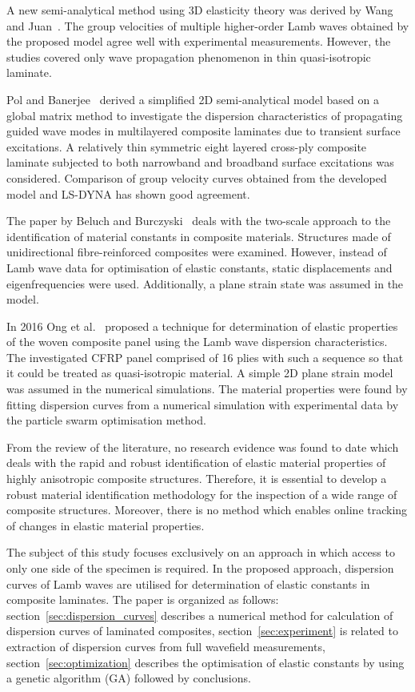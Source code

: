 	A new semi-analytical method using 3D elasticity theory was derived by Wang and Juan~\cite{Wang2007}. The group velocities of multiple higher-order Lamb waves obtained by the proposed model agree well with experimental measurements. However, the studies covered only wave propagation phenomenon in thin quasi-isotropic laminate. 
	
	Pol and Banerjee~\cite{Pol2013} derived a simplified 2D semi-analytical model based on a global matrix method to investigate the dispersion characteristics of propagating guided wave modes in multilayered composite laminates due to transient surface excitations. A relatively thin symmetric eight layered cross-ply composite laminate subjected to both narrowband and broadband surface excitations was considered. Comparison of group velocity curves obtained from the developed model and LS-DYNA has shown good agreement.
	
	The paper by Beluch and Burczyski~\cite{Beluch2014} deals with the two-scale approach to the identification of material constants in composite materials. Structures made of unidirectional fibre-reinforced composites were examined. However, instead of Lamb wave data for optimisation of elastic constants, static displacements and eigenfrequencies were used. Additionally, a plane strain state was assumed in the model.
	
	In 2016 Ong et al.~\cite{Ong2016} proposed a technique for determination of elastic properties of the woven composite panel using the Lamb wave dispersion characteristics. The investigated CFRP panel comprised of 16 plies with such a sequence so that it could be treated as quasi-isotropic material. A simple 2D plane strain model was assumed in the numerical simulations. The material properties were found by fitting dispersion curves from a numerical simulation with experimental data by the particle swarm optimisation method. 
	
	From the review of the literature, no research evidence was found to date which deals with the rapid and robust identification of elastic material properties of highly anisotropic composite structures. Therefore, it is essential to develop a robust material identification methodology for the inspection of a wide range of composite structures. Moreover, there is no method which enables online tracking of changes in elastic material properties.
	
	The subject of this study focuses exclusively on an approach in which access to only one side of the specimen is required. In the proposed approach, dispersion curves of Lamb waves are utilised for determination of elastic constants in composite laminates. The paper is organized as follows: section~\ref{sec:dispersion_curves} describes a numerical method for calculation of dispersion curves of laminated composites, section~\ref{sec:experiment} is related to extraction of dispersion curves from full wavefield measurements, section~\ref{sec:optimization} describes the optimisation of elastic constants by using a genetic algorithm (GA) followed by conclusions.
	
